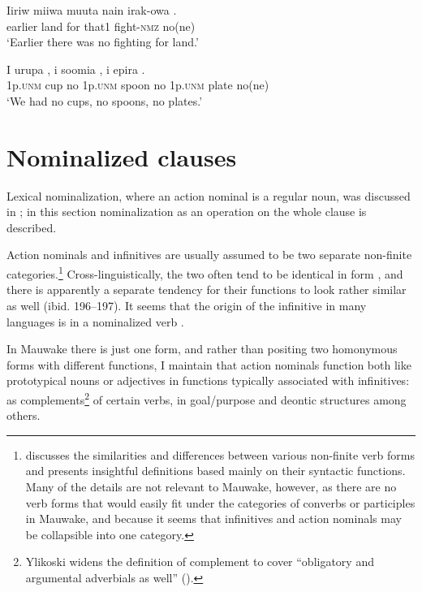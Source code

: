 \ea%
\label{ex:5:x982}
\gll Iiriw  miiwa  muuta  nain  irak-owa  . \\
     earlier  land  for  that1  fight-\textsc{nmz}  no(ne) \\
\glt `Earlier there was no fighting for land.'
\z

\ea%
\label{ex:5:x983}
\gll I  urupa  ,  i  soomia  ,  i epira  . \\
     1p.\textsc{unm}  cup  no  1p.\textsc{unm}  spoon  no  1p.\textsc{unm} plate  no(ne) \\
\glt `We had no cups, no spoons, no plates.'
\z

\section{Nominalized clauses}

Lexical nominalization, where an action nominal is a regular noun, was discussed in ; in this section nominalization as an operation on the whole clause is described.

Action nominals and infinitives are usually assumed to be two separate non-finite categories.\footnote{\citet{Ylikoski2003,Ylikoski2009} discusses the similarities and differences between various non-finite verb forms and presents insightful definitions based mainly on their syntactic functions. Many of the details are not relevant to Mauwake, however, as there are no verb forms that would easily fit under the categories of converbs or participles in Mauwake, and because it seems that infinitives and action nominals may be collapsible into one category.} Cross-linguistically, the two often tend to be identical in form \citep[224]{Ylikoski2003}, and there is apparently a separate tendency for their functions to look rather similar as well (ibid. 196--197). It seems that the origin of the infinitive in many languages is in a nominalized verb \citep[69]{Noonan2007}. 

In Mauwake there is just one form, and rather than positing two homonymous forms with different functions, I maintain that action nominals function both like prototypical nouns or adjectives  in functions typically associated with infinitives: as complements\footnote{Ylikoski widens the definition of complement to cover ``obligatory and argumental adverbials as well'' (\citeyear[209]{Ylikoski2003}).} of certain verbs, in goal/purpose and deontic structures among others.  

